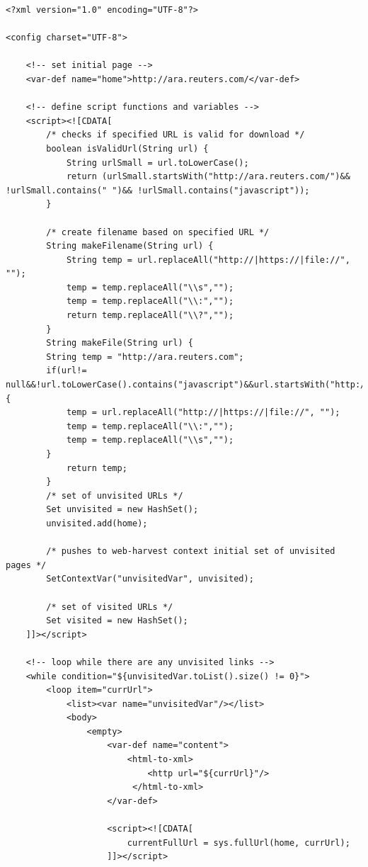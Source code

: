 \begin{lstlisting}
<?xml version="1.0" encoding="UTF-8"?>

<config charset="UTF-8">

    <!-- set initial page -->
    <var-def name="home">http://ara.reuters.com/</var-def>

    <!-- define script functions and variables -->
    <script><![CDATA[
        /* checks if specified URL is valid for download */
        boolean isValidUrl(String url) {
            String urlSmall = url.toLowerCase();
            return (urlSmall.startsWith("http://ara.reuters.com/")&& !urlSmall.contains(" ")&& !urlSmall.contains("javascript"));
        }

        /* create filename based on specified URL */
        String makeFilename(String url) {
        	String temp = url.replaceAll("http://|https://|file://", "");
        	temp = temp.replaceAll("\\s","");
        	temp = temp.replaceAll("\\:","");
           	return temp.replaceAll("\\?","");
        }
		String makeFile(String url) {
		String temp = "http://ara.reuters.com";
		if(url!= null&&!url.toLowerCase().contains("javascript")&&url.startsWith("http://ara.reuters.com/")){
			temp = url.replaceAll("http://|https://|file://", "");
			temp = temp.replaceAll("\\:","");
	        temp = temp.replaceAll("\\s","");
		}
	        return temp;
        }
        /* set of unvisited URLs */
        Set unvisited = new HashSet();
        unvisited.add(home);

        /* pushes to web-harvest context initial set of unvisited pages */
        SetContextVar("unvisitedVar", unvisited);

        /* set of visited URLs */
        Set visited = new HashSet();
    ]]></script>

    <!-- loop while there are any unvisited links -->
    <while condition="${unvisitedVar.toList().size() != 0}">
        <loop item="currUrl">
            <list><var name="unvisitedVar"/></list>
            <body>
                <empty>
                    <var-def name="content">
                        <html-to-xml>
                            <http url="${currUrl}"/>
                         </html-to-xml>
                    </var-def>

                    <script><![CDATA[
                        currentFullUrl = sys.fullUrl(home, currUrl);
                    ]]></script>


\end{lstlisting}
